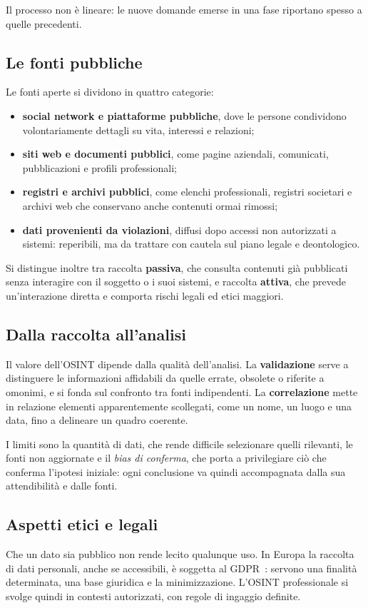 Il processo non è lineare: le nuove domande emerse in una fase riportano spesso a quelle precedenti.

\subsection{Le fonti pubbliche}

Le fonti aperte si dividono in quattro categorie:

\begin{itemize}
    \item \textbf{social network e piattaforme pubbliche}, dove le persone condividono volontariamente dettagli su vita, interessi e relazioni;
    \item \textbf{siti web e documenti pubblici}, come pagine aziendali, comunicati, pubblicazioni e profili professionali;
    \item \textbf{registri e archivi pubblici}, come elenchi professionali, registri societari e archivi web che conservano anche contenuti ormai rimossi;
    \item \textbf{dati provenienti da violazioni}, diffusi dopo accessi non autorizzati a sistemi: reperibili, ma da trattare con cautela sul piano legale e deontologico.
\end{itemize}

Si distingue inoltre tra raccolta \textbf{passiva}, che consulta contenuti già pubblicati senza interagire con il soggetto o i suoi sistemi, e raccolta \textbf{attiva}, che prevede un'interazione diretta e comporta rischi legali ed etici maggiori.

\subsection{Dalla raccolta all'analisi}

Il valore dell'OSINT dipende dalla qualità dell'analisi. La \textbf{validazione} serve a distinguere le informazioni affidabili da quelle errate, obsolete o riferite a omonimi, e si fonda sul confronto tra fonti indipendenti. La \textbf{correlazione} mette in relazione elementi apparentemente scollegati, come un nome, un luogo e una data, fino a delineare un quadro coerente.

I limiti sono la quantità di dati, che rende difficile selezionare quelli rilevanti, le fonti non aggiornate e il \textit{bias di conferma}, che porta a privilegiare ciò che conferma l'ipotesi iniziale: ogni conclusione va quindi accompagnata dalla sua attendibilità e dalle fonti.

\subsection{Aspetti etici e legali}

Che un dato sia pubblico non rende lecito qualunque uso. In Europa la raccolta di dati personali, anche se accessibili, è soggetta al GDPR~\cite{gdpr2016}: servono una finalità determinata, una base giuridica e la minimizzazione. L'OSINT professionale si svolge quindi in contesti autorizzati, con regole di ingaggio definite.
